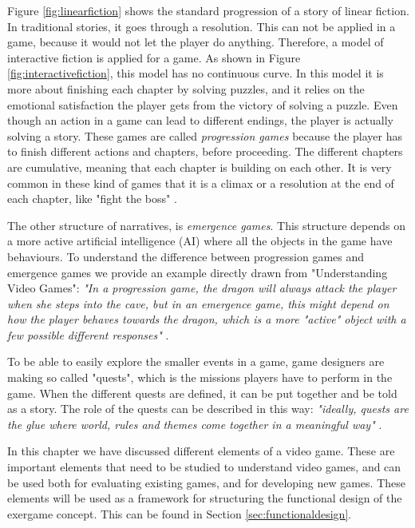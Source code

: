 Figure \ref{fig:linearfiction} shows the standard progression of a story of linear fiction. In traditional stories, it goes through a resolution. This can not be applied in a game, because it would not let the player do anything. Therefore, a model of interactive fiction is applied for a game. As shown in Figure \ref{fig:interactivefiction}, this model has no continuous curve. In this model it is more about finishing each chapter by solving puzzles, and it relies on the emotional satisfaction the player gets from the victory of solving a puzzle. Even though an action in a game can lead to different endings, the player is actually solving a story. These games are called \emph{progression games} because the player has to finish different actions and chapters, before proceeding. The different chapters are cumulative, meaning that each chapter is building on each other. It is very common in these kind of games that it is a climax or a resolution at the end of each chapter, like "fight the boss" \cite{understandingvg}. 

The other structure of narratives, is \emph{emergence games}. This structure depends on a more active artificial intelligence (AI) where all the objects in the game have behaviours. To understand the difference between progression games and emergence games we provide an example directly drawn from "Understanding Video Games": \emph{"In a progression game, the dragon will always attack the player when she steps into the cave, but in an emergence game, this might depend on how the player behaves towards the dragon, which is a more "active" object with a few possible different responses"} \cite{understandingvg}.

To be able to easily explore the smaller events in a game, game designers are making so called "quests", which is the missions players have to perform in the game. When the different quests are defined, it can be put together and be told as a story. The role of the quests can be described in this way: \emph{"ideally, quests are the glue where world, rules and themes come together in a meaningful way"} \cite{understandingvg}.

In this chapter we have discussed different elements of a video game. These are important elements that need to be studied to understand video games, and can be used both for evaluating existing games, and for developing new games. These elements will be used as a framework for structuring the functional design of the exergame concept. This can be found in Section \ref{sec:functionaldesign}.

